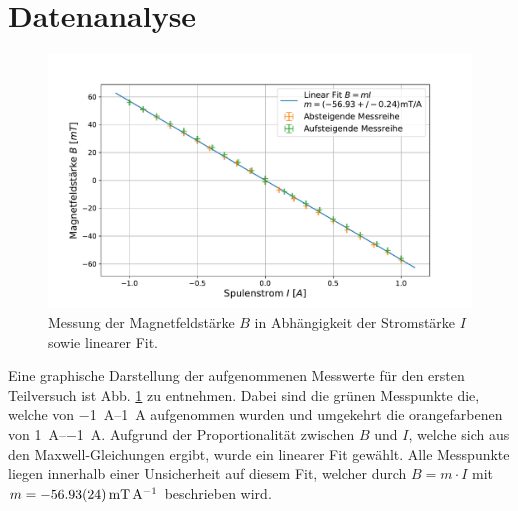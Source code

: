 \section{Datenanalyse} \label{sec:Analyse}
	
	\begin{figure}[ht]
		\centering
		\includegraphics[width=\textwidth]{data/Magnetfeld.pdf}
		\caption{Messung der Magnetfeldstärke $B$ in Abhängigkeit der Stromstärke $I$ sowie linearer Fit.}
		\label{fig:Magnetfeld}	
	\end{figure}		
	Eine graphische Darstellung der aufgenommenen Messwerte für den ersten Teilversuch ist Abb. \ref{fig:Magnetfeld} zu entnehmen.
	Dabei sind die grünen Messpunkte die, welche von \SIrange{-1}{1}{\ampere} aufgenommen wurden und umgekehrt die orangefarbenen von \SIrange{1}{-1}{\ampere}.
	Aufgrund der Proportionalität zwischen $B$ und $I$, welche sich aus den Maxwell-Gleichungen ergibt, wurde ein linearer Fit gewählt.
	Alle Messpunkte liegen innerhalb einer Unsicherheit auf diesem Fit, welcher durch $B = m\cdot I$ mit $m = \SI{-56.93+-0.24}{\milli\tesla\per\ampere}$ beschrieben wird.
	
